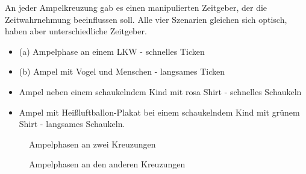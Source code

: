 \documentclass{Paper}
\begin{document}
An jeder Ampelkreuzung gab es einen manipulierten Zeitgeber, der die
Zeitwahrnehmung beeinflussen soll. Alle vier Szenarien gleichen sich optisch, haben aber unterschiedliche Zeitgeber. 
\begin{itemize}
\item{(a) Ampelphase an einem LKW - schnelles Ticken} 
\item{(b) Ampel mit Vogel und Menschen - langsames Ticken}
\item{Ampel neben einem schaukelndem Kind mit rosa Shirt - schnelles Schaukeln} 
\item{Ampel mit Heißluftballon-Plakat bei einem schaukelndem Kind mit grünem Shirt - langsames Schaukeln.}
\end{itemize}


\begin{figure}[H]
	\caption{Ampelphasen an zwei Kreuzungen}
	\label{img:ampelphasen-1}
\end{figure}

\begin{figure}[H]
	\caption{Ampelphasen an den anderen Kreuzungen}
	\label{img:ampelphasen-2}
\end{figure}
\end{document}
